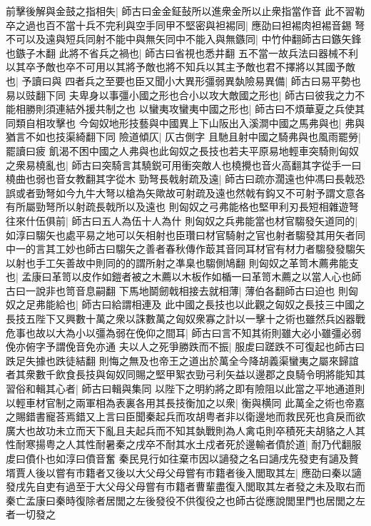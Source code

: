 前擊後解與金鼓之指相失|{
	師古曰金金鉦鼔所以進衆金所以止衆指當作音}
此不習勒卒之過也百不當十兵不完利與空手同甲不堅密與袒裼同|{
	應劭曰袒裼肉袒裼音錫}
弩不可以及遠與短兵同射不能中與無矢同中不能入與無鏃同|{
	中竹仲翻師古曰鏃矢鋒也鏃子木翻}
此將不省兵之禍也|{
	師古曰省視也悉井翻}
五不當一故兵法曰器械不利以其卒予敵也卒不可用以其將予敵也將不知兵以其主予敵也君不擇將以其國予敵也|{
	予讀曰與}
四者兵之至要也臣又聞小大異形彊弱異埶險易異備|{
	師古曰易平勢也易以豉翻下同}
夫卑身以事彊小國之形也合小以攻大敵國之形也|{
	師古曰彼我之力不能相勝則須連結外援共制之也}
以蠻夷攻蠻夷中國之形也|{
	師古曰不煩華夏之兵使其同類自相攻擊也}
今匈奴地形技藝與中國異上下山阪出入溪澗中國之馬弗與也|{
	弗與猶言不如也技渠綺翻下同}
險道傾仄|{
	仄古側字}
且馳且射中國之騎弗與也風雨罷勞|{
	罷讀曰疲}
飢渴不困中國之人弗與也此匈奴之長技也若夫平原易地輕車突騎則匈奴之衆易橈亂也|{
	師古曰突騎言其驍鋭可用衝突敵人也橈攪也音火高翻其字從手一曰橈曲也弱也音女教翻其字從木}
勁弩長戟射疏及遠|{
	師古曰疏亦濶遠也仲馮曰長戟恐誤或者勁弩如今九牛大弩以槍為矢歟故可射疏及遠也然戟有鈎又不可射予謂文意各有所屬勁弩所以射疏長戟所以及遠也}
則匈奴之弓弗能格也堅甲利刃長短相雜遊弩往來什伍俱前|{
	師古曰五人為伍十人為什}
則匈奴之兵弗能當也材官騶發矢道同的|{
	如淳曰騶矢也處平易之地可以矢相射也臣瓚曰材官騎射之官也射者騶發其用矢者同中一的言其工妙也師古曰騶矢之善者春秋傳作菆其音同耳材官有材力者騶發發騶矢以射也手工矢善故中則同的的謂所射之凖臬也騶側鳩翻}
則匈奴之革笥木薦弗能支也|{
	孟康曰革笥以皮作如鎧者被之木薦以木板作如楯一曰革笥木薦之以當人心也師古曰一說非也笥音息嗣翻}
下馬地鬬劒戟相接去就相薄|{
	薄伯各翻師古曰迫也}
則匈奴之足弗能給也|{
	師古曰給謂相連及}
此中國之長技也以此觀之匈奴之長技三中國之長技五陛下又興數十萬之衆以誅數萬之匈奴衆寡之計以一擊十之術也雖然兵凶器戰危事也故以大為小以彊為弱在俛仰之間耳|{
	師古曰言不知其術則雖大必小雖彊必弱俛亦俯字予謂俛音免亦通}
夫以人之死爭勝跌而不振|{
	服䖍曰蹉跌不可復起也師古曰跌足失據也跌徒結翻}
則悔之無及也帝王之道出於萬全今降胡義渠蠻夷之屬來歸誼者其衆數千飲食長技與匈奴同賜之堅甲絮衣勁弓利矢益以邊郡之良騎令明將能知其習俗和輯其心者|{
	師古曰輯與集同}
以陛下之明約將之即有險阻以此當之平地通道則以輕車材官制之兩軍相為表裏各用其長技衡加之以衆|{
	衡與横同}
此萬全之術也帝嘉之賜錯書寵荅焉錯又上言曰臣聞秦起兵而攻胡粤者非以衛邊地而救民死也貪戾而欲廣大也故功未立而天下亂且夫起兵而不知其埶戰則為人禽屯則卒積死夫胡貉之人其性耐寒揚粤之人其性耐暑秦之戌卒不耐其水土戍者死於邊輸者僨於道|{
	耐乃代翻服䖍曰僨仆也如淳曰僨音奮}
秦民見行如往棄市因以讁發之名曰讁戌先發吏有讁及贅壻賈人後以嘗有市籍者又後以大父母父母嘗有市籍者後入閭取其左|{
	應劭曰秦以讁發戌先自吏有過至于大父母父母嘗有市籍者曹輩盡復入閭取其左者發之未及取右而秦亡孟康曰秦時復除者居閭之左後發役不供復役之也師古從應說閭里門也居閭之左者一切發之}

